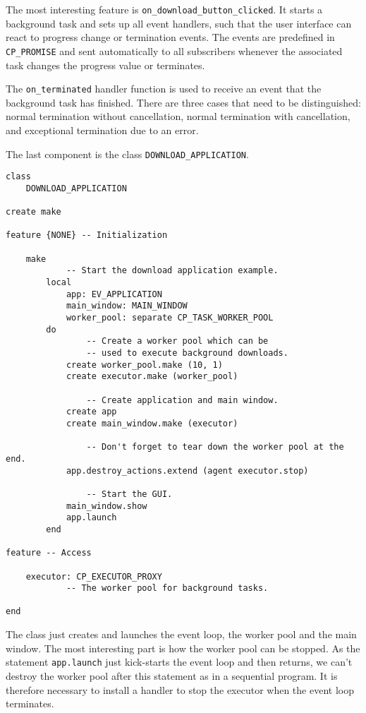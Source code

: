 The most interesting feature is \lstinline!on_download_button_clicked!.
It starts a background task and sets up all event handlers, such that the user interface can react to progress change or termination events.
The events are predefined in \lstinline!CP_PROMISE! and sent automatically to all subscribers whenever the associated task changes the progress value or terminates.

The \lstinline!on_terminated! handler function is used to receive an event that the background task has finished.
There are three cases that need to be distinguished: normal termination without cancellation, normal termination with cancellation, and exceptional termination due to an error.

The last component is the class \lstinline!DOWNLOAD_APPLICATION!.

\begin{lstlisting}[language=OOSC2Eiffel, label={code:download-application}, captionpos=b, caption={Download application root class.}]
class
	DOWNLOAD_APPLICATION

create make

feature {NONE} -- Initialization

	make
			-- Start the download application example.
		local
			app: EV_APPLICATION
			main_window: MAIN_WINDOW
			worker_pool: separate CP_TASK_WORKER_POOL
		do
				-- Create a worker pool which can be 
				-- used to execute background downloads.
			create worker_pool.make (10, 1)
			create executor.make (worker_pool)

				-- Create application and main window.
			create app
			create main_window.make (executor)

				-- Don't forget to tear down the worker pool at the end.
			app.destroy_actions.extend (agent executor.stop)

				-- Start the GUI.
			main_window.show
			app.launch
		end

feature -- Access

	executor: CP_EXECUTOR_PROXY
			-- The worker pool for background tasks.

end
\end{lstlisting}

The class just creates and launches the event loop, the worker pool and the main window.
The most interesting part is how the worker pool can be stopped.
As the statement \lstinline!app.launch! just kick-starts the event loop and then returns, we can't destroy the worker pool after this statement as in a sequential program.
It is therefore necessary to install a handler to stop the executor when the event loop terminates.

